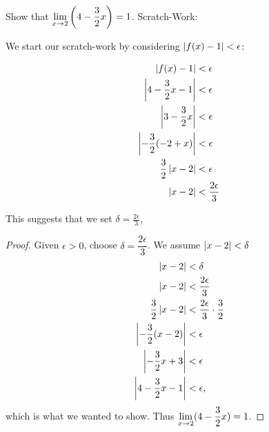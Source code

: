 \begin{example}\label{ex_compute_limNew8}%
Show that $\displaystyle \lim_{x\to 2}\left(4-\frac{3}{2}x\right)=1$.
\solution
Scratch-Work:
 
We start our scratch-work by considering $\left\lvert f(x)-1 \right\rvert<\epsilon$:

\allowdisplaybreaks
\begin{align*}
\left\lvert f(x)-1 \right\rvert&<\epsilon \\
\left\lvert 4-\frac{3}{2}x-1 \right\rvert&<\epsilon \\
\left\lvert 3-\frac{3}{2}x \right\rvert&<\epsilon\\
\left\lvert -\frac{3}{2}(-2+x) \right\rvert&<\epsilon \\
\frac{3}{2}\left\lvert x-2 \right\rvert&<\epsilon \\
\left\lvert x-2 \right\rvert&<\frac{2\epsilon}{3}
\end{align*}

This suggests that we set $\delta=\frac{2\epsilon}{3}$,

\begin{proof}
Given $\epsilon>0$, choose $\delta=\dfrac{2\epsilon}{3}$. We assume $\left\lvert x-2 \right\rvert<\delta$
%
\begin{align*}
\left\lvert x - 2 \right\rvert &< \delta \\
\left\lvert x - 2 \right\rvert &< \frac{2\epsilon}{3}\\
\frac{3}{2}\left\lvert x - 2 \right\rvert &< \frac{2\epsilon}{3}\cdot \frac{3}{2}\\
\left\lvert -\frac{3}{2}(x-2) \right\rvert&< \epsilon \\
\left\lvert -\frac{3}{2}x+3 \right\rvert&< \epsilon  \\
\left\lvert 4-\frac{3}{2}x-1 \right\rvert&< \epsilon,
\end{align*}
%
which is what we wanted to show. Thus  $\displaystyle \lim_{x\to 2}(4-\frac32 x)=1$.\qedhere
\end{proof}
\end{example}

